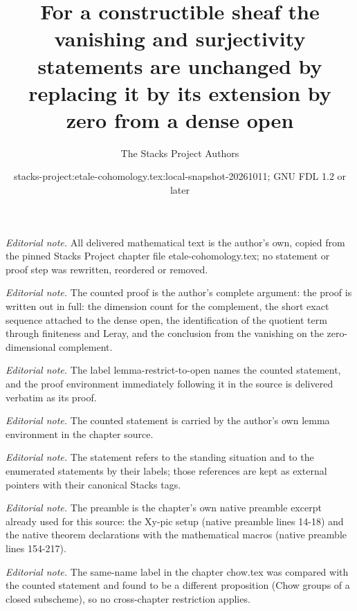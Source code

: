 \documentclass[10pt,a4paper]{amsart}
\title{For a constructible sheaf the vanishing and surjectivity statements are unchanged by replacing it by its extension by zero from a dense open}
\author{The Stacks Project Authors}
\date{stacks-project:etale-cohomology.tex:local-snapshot-20261011; GNU FDL 1.2 or later}
\theoremstyle{plain}
\theoremstyle{definition}
\theoremstyle{remark}
\numberwithin{equation}{subsection}
\begin{document}
\maketitle
\noindent\textit{Editorial note.} All delivered mathematical text is the author's own, copied from the pinned Stacks Project chapter file etale-cohomology.tex; no statement or proof step was rewritten, reordered or removed.\par\medskip
\noindent\textit{Editorial note.} The counted proof is the author's complete argument: the proof is written out in full: the dimension count for the complement, the short exact sequence attached to the dense open, the identification of the quotient term through finiteness and Leray, and the conclusion from the vanishing on the zero-dimensional complement.\par\medskip
\noindent\textit{Editorial note.} The label lemma-restrict-to-open names the counted statement, and the proof environment immediately following it in the source is delivered verbatim as its proof.\par\medskip
\noindent\textit{Editorial note.} The counted statement is carried by the author's own lemma environment in the chapter source.\par\medskip
\noindent\textit{Editorial note.} The statement refers to the standing situation and to the enumerated statements by their labels; those references are kept as external pointers with their canonical Stacks tags.\par\medskip
\noindent\textit{Editorial note.} The preamble is the chapter's own native preamble excerpt already used for this source: the Xy-pic setup (native preamble lines 14-18) and the native theorem declarations with the mathematical macros (native preamble lines 154-217).\par\medskip
\noindent\textit{Editorial note.} The same-name label in the chapter chow.tex was compared with the counted statement and found to be a different proposition (Chow groups of a closed subscheme), so no cross-chapter restriction applies.\par\medskip
\end{document}
